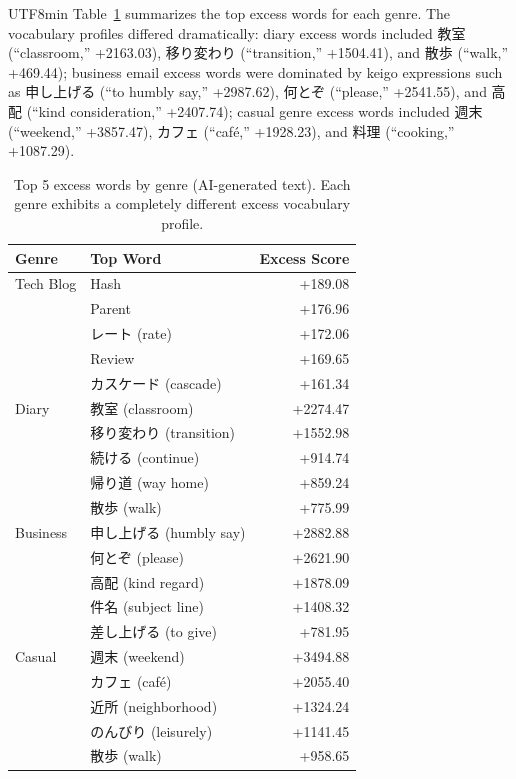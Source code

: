 \documentclass[11pt,a4paper]{article}
\begin{document}
\begin{CJK}{UTF8}{min}
Table~\ref{tab:genre_excess} summarizes the top excess words for each genre. The vocabulary profiles differed dramatically: diary excess words included 教室 (``classroom,'' +2163.03), 移り変わり (``transition,'' +1504.41), and 散歩 (``walk,'' +469.44); business email excess words were dominated by keigo expressions such as 申し上げる (``to humbly say,'' +2987.62), 何とぞ (``please,'' +2541.55), and 高配 (``kind consideration,'' +2407.74); casual genre excess words included 週末 (``weekend,'' +3857.47), カフェ (``caf\'{e},'' +1928.23), and 料理 (``cooking,'' +1087.29).

\begin{table}[H]
\centering
\caption{Top 5 excess words by genre (AI-generated text). Each genre exhibits a completely different excess vocabulary profile.}
\label{tab:genre_excess}
\small
\begin{tabular}{llr}
\toprule
Genre & Top Word & Excess Score \\
\midrule
Tech Blog   & Hash             & +189.08 \\
            & Parent           & +176.96 \\
            & レート (rate)      & +172.06 \\
            & Review           & +169.65 \\
            & カスケード (cascade)& +161.34 \\
\midrule
Diary       & 教室 (classroom)   & +2274.47 \\
            & 移り変わり (transition) & +1552.98 \\
            & 続ける (continue)  & +914.74 \\
            & 帰り道 (way home)  & +859.24 \\
            & 散歩 (walk)        & +775.99 \\
\midrule
Business    & 申し上げる (humbly say) & +2882.88 \\
            & 何とぞ (please)    & +2621.90 \\
            & 高配 (kind regard) & +1878.09 \\
            & 件名 (subject line) & +1408.32 \\
            & 差し上げる (to give) & +781.95 \\
\midrule
Casual      & 週末 (weekend)     & +3494.88 \\
            & カフェ (caf\'{e})     & +2055.40 \\
            & 近所 (neighborhood)& +1324.24 \\
            & のんびり (leisurely) & +1141.45 \\
            & 散歩 (walk)        & +958.65 \\
\bottomrule
\end{tabular}
\end{table}


\end{CJK}
\end{document}
